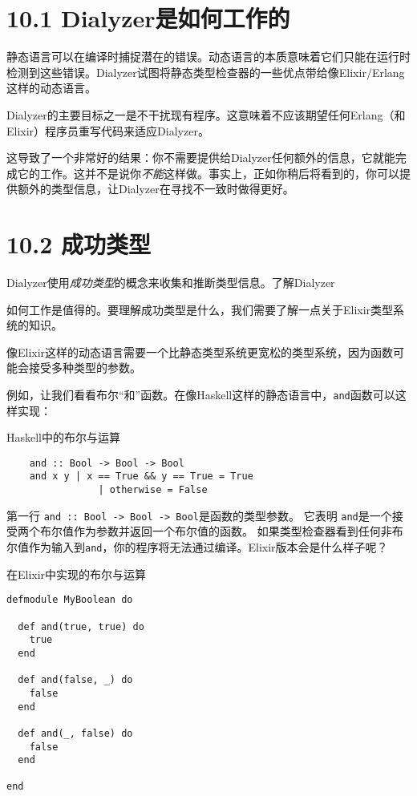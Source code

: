 \section{10.1 Dialyzer是如何工作的}

静态语言可以在编译时捕捉潜在的错误。动态语言的本质意味着它们只能在运行时检测到这些错误。Dialyzer试图将静态类型检查器的一些优点带给像Elixir/Erlang这样的动态语言。

Dialyzer的主要目标之一是不干扰现有程序。这意味着不应该期望任何Erlang（和Elixir）程序员重写代码来适应Dialyzer。

这导致了一个非常好的结果：你不需要提供给Dialyzer任何额外的信息，它就能完成它的工作。这并不是说你\emph{不能}这样做。事实上，正如你稍后将看到的，你可以提供额外的类型信息，让Dialyzer在寻找不一致时做得更好。

\section{10.2 成功类型}

Dialyzer使用\emph{成功类型}的概念来收集和推断类型信息。了解Dialyzer

如何工作是值得的。要理解成功类型是什么，我们需要了解一点关于Elixir类型系统的知识。

像Elixir这样的动态语言需要一个比静态类型系统更宽松的类型系统，因为函数可能会接受多种类型的参数。

例如，让我们看看布尔``和''函数。在像Haskell这样的静态语言中，\texttt{and}函数可以这样实现：

\begin{code}{Haskell中的布尔与运算}
  \begin{verbatim}
    and :: Bool -> Bool -> Bool
    and x y | x == True && y == True = True
                | otherwise = False
  \end{verbatim}
  \label{lst:boolean-in-haskell}
\end{code}

第一行 \texttt{and :: Bool -> Bool -> Bool}是函数的类型参数。
它表明 \texttt{and}是一个接受两个布尔值作为参数并返回一个布尔值的函数。
如果类型检查器看到任何非布尔值作为输入到\texttt{and}，你的程序将无法通过编译。Elixir版本会是什么样子呢？

\begin{code}{在Elixir中实现的布尔与运算}
\begin{verbatim} 
defmodule MyBoolean do

  def and(true, true) do
    true
  end
  
  def and(false, _) do
    false
  end
  
  def and(_, false) do
    false
  end
  
end
\end{verbatim}
\label{lst:boolean-in-elixir}
\end{code}

